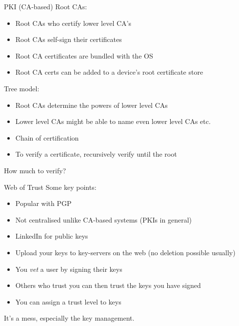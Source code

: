 \begin{frame}{PKI (CA-based)}
  \pause
  Root CAs:
  \begin{itemize}[<+(1)->]
    \item Root CAs who certify lower level CA's
    \item Root CAs self-sign their certificates
    \item Root CA certificates are bundled with the OS
    \item Root CA certs can be added to a device's root certificate store
  \end{itemize}

  \pause
  Tree model:
  \begin{itemize}[<+(1)->]
    \item Root CAs determine the powers of lower level CAs
    \item Lower level CAs might be able to name even lower level CAs etc.
    \item Chain of certification
    \item To verify a certificate, recursively verify until the root
  \end{itemize}

  \pause
  How much to verify?
\end{frame}

\begin{frame}{Web of Trust}
  Some key points:
  \begin{itemize}[<+(1)->]
    \item Popular with PGP
    \item Not centralised unlike CA-based systems (PKIs in general)
    \item LinkedIn for public keys
    \item Upload your keys to key-servers on the web (no deletion possible usually)
    \item You \emph{vet} a user by signing their keys
    \item Others who trust you can then trust the keys you have signed
    \item You can assign a trust level to keys
  \end{itemize}

  \pause
  It's a mess, especially the key management.
\end{frame}


